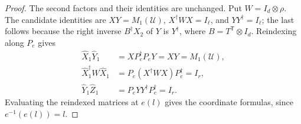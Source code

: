 \begin{proof}\leanok
    The second factors and their identities are unchanged. Put
    $W=I_d\otimes\rho$. The candidate identities are
    $XY=M_1(\mathcal U)$, $X^\dagger WX=I_\ell$, and $YY^\dagger=I_\ell$;
    the last follows because the right inverse $B^\dagger X_2$ of $Y$
    is $Y^\dagger$, where $B=T^{\mathsf T}\otimes I_d$.
    Reindexing along $P_e$ gives
    \begin{align}
        \widehat X_1\widehat Y_1
         & =XP_e^\dagger P_eY=XY=M_1(\mathcal U), \\
        \widehat X_1^\dagger W\widehat X_1
         & =P_e(X^\dagger WX)P_e^\dagger=I_r,     \\
        \widehat Y_1\widehat Z_1
         & =P_eYY^\dagger P_e^\dagger=I_r.
    \end{align}
    Evaluating the reindexed matrices at $e(l)$ gives the coordinate
    formulas, since $e^{-1}(e(l))=l$.
\end{proof}

